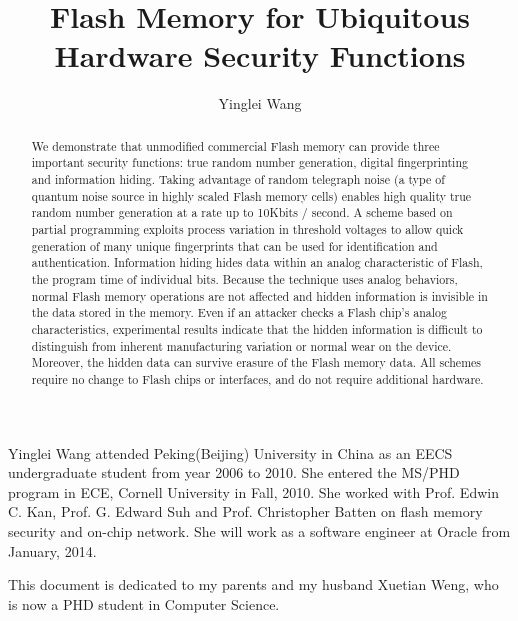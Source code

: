 \documentclass[master,tocprelim]{cornell}
\title {Flash Memory for Ubiquitous Hardware Security Functions}
\author {Yinglei Wang}
\begin{document}
\maketitle
\makecopyright

\begin{abstract}
We demonstrate that unmodified commercial Flash memory can 
provide three important security functions: true random number 
generation, digital fingerprinting and information hiding. Taking advantage of random telegraph 
noise (a type of quantum noise source in highly scaled Flash memory cells) 
enables high quality true random number generation at a rate up to  
10Kbits / second. A scheme based on partial programming exploits process 
variation in threshold voltages to allow quick generation of many unique 
fingerprints that can be used for identification and authentication. 
Information hiding hides 
data within an analog characteristic of Flash, the program time of individual bits. 
Because the technique uses analog behaviors, normal Flash memory operations are
not affected and hidden information is invisible in the data stored in the memory.
Even if an attacker checks a Flash chip's analog characteristics,
experimental results indicate that the hidden information is difficult to distinguish 
from inherent manufacturing variation or normal wear on the device.
Moreover, the hidden data can survive erasure of the Flash memory data.
All
schemes require no change to Flash chips or interfaces, and do not require additional hardware. 
\end{abstract}

\begin{biosketch}
Yinglei Wang attended Peking(Beijing) University in China as an EECS undergraduate student from year 2006 to 2010. 
She entered the MS/PHD program in ECE, Cornell University in Fall, 2010. She worked with Prof. Edwin C. Kan, 
Prof. G. Edward Suh and Prof. Christopher Batten on flash memory security and on-chip network. She will work as
a software engineer at Oracle from January, 2014.
\end{biosketch}

\begin{dedication}
This document is dedicated to my parents and my husband Xuetian Weng, who is now a PHD student in Computer Science.
\end{dedication}
\end{document}
